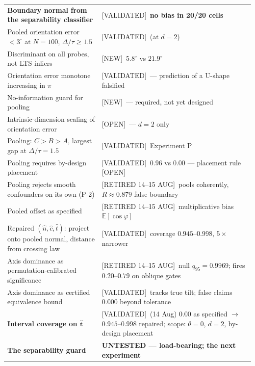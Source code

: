\documentclass[11pt]{article}
\newcommand{\nhat}{\hat{n}}
\newcommand{\chat}{\hat{c}}
\newcommand{\that}{\hat{t}}
\newcommand{\provtag}[2]{{\footnotesize\sffamily\textcolor{#1}{[#2]}}}
\newcommand{\VALID}{\provtag{okgreen}{VALIDATED}}
\newcommand{\NEWT}{\provtag{newmag}{NEW}}
\newcommand{\OPENT}{\provtag{openamber}{OPEN}}
\newcommand{\RETIRED}{\provtag{limred}{RETIRED 14--15 AUG}}
\begin{document}
{\begin{longtable}{@{}p{}p{}@{}}
\textbf{Boundary normal from the separability classifier}
  & \VALID\ \textbf{no bias in 20/20 cells}\\
Pooled orientation error $< 3^\circ$ at $N = 100$, $\Delta/\tau \ge 1.5$ & \VALID\ (at $d = 2$)\\
Discriminant on all probes, not LTS inliers & \NEWT\ $5.8^\circ$ vs $21.9^\circ$\\
Orientation error monotone increasing in $\pi$ & \VALID\ --- prediction of a U-shape falsified\\
No-information guard for pooling & \NEWT\ --- required, not yet designed\\
Intrinsic-dimension scaling of orientation error & \OPENT\ --- $d = 2$ only\\
Pooling: $C > B > A$, largest gap at $\Delta/\tau = 1.5$ & \VALID\ Experiment P\\
Pooling requires by-design placement & \VALID\ $0.96$ vs $0.00$ --- placement rule \OPENT\\
Pooling rejects smooth confounders on its own (P-2) & \RETIRED\ pools coherently,
  $R \approx 0.879$ false boundary\\
Pooled offset as specified & \RETIRED\ multiplicative bias $\mathbb{E}[\cos\varphi]$\\
Repaired $(\nhat,\chat,\that)$: project onto pooled normal, distance from crossing law
  & \VALID\ coverage $0.945$--$0.998$, $5\times$ narrower\\
Axis dominance as permutation-calibrated significance & \RETIRED\ null $q_{95} = 0.9969$;
  fires $0.20$--$0.79$ on oblique gates\\
Axis dominance as certified equivalence bound & \VALID\ tracks true tilt; false claims
  $0.000$ beyond tolerance\\
\textbf{Interval coverage on $\bm\that$} & \VALID\ (14 Aug) $0.00$ as specified $\to$
  $\bm{0.945}$--$\bm{0.998}$ repaired; scope: $\theta = 0$, $d = 2$, by-design placement\\
\textbf{The separability guard} & \textcolor{limred}{\textbf{UNTESTED --- load-bearing;
  the next experiment}}\\
\bottomrule
\end{longtable}}
\end{document}

